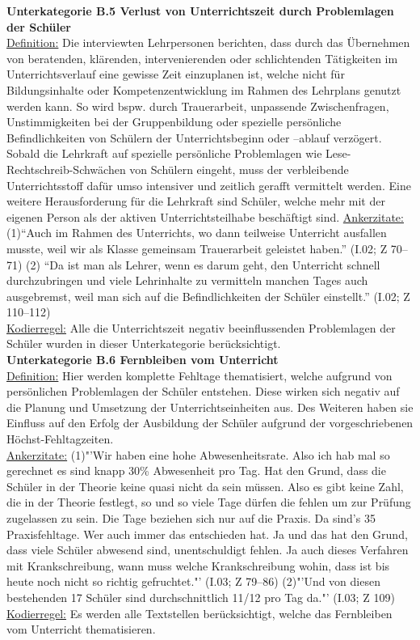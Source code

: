 \textbf{Unterkategorie B.5 Verlust von Unterrichtszeit durch Problemlagen der Schüler}\\
\underline{Definition:} Die interviewten Lehrpersonen berichten, dass durch das Übernehmen von beratenden, klärenden, intervenierenden oder schlichtenden Tätigkeiten im Unterrichtsverlauf eine gewisse Zeit einzuplanen ist, welche nicht für Bildungsinhalte oder Kompetenzentwicklung im Rahmen des Lehrplans genutzt werden kann. So wird bspw. durch Trauerarbeit, unpassende Zwischenfragen, Unstimmigkeiten bei der Gruppenbildung oder spezielle persönliche Befindlichkeiten von Schülern der Unterrichtsbeginn oder --ablauf verzögert. Sobald die Lehrkraft auf spezielle persönliche Problemlagen wie Lese-Rechtschreib-Schwächen von Schülern eingeht, muss der verbleibende Unterrichtsstoff dafür umso intensiver und zeitlich gerafft vermittelt werden. Eine weitere Herausforderung für die Lehrkraft sind Schüler, welche mehr mit der eigenen Person als der aktiven Unterrichtsteilhabe beschäftigt sind.
\underline{Ankerzitate:} (1)"`Auch im Rahmen des Unterrichts, wo dann teilweise Unterricht ausfallen musste, weil wir als Klasse gemeinsam Trauerarbeit geleistet haben."' (I.02; Z 70--71) (2) "`Da ist man als Lehrer, wenn es darum geht, den Unterricht schnell durchzubringen und viele Lehrinhalte zu vermitteln manchen Tages auch ausgebremst, weil man sich auf die Befindlichkeiten der Schüler einstellt."' (I.02; Z 110--112)\\
\underline{Kodierregel:} Alle die Unterrichtszeit negativ beeinflussenden Problemlagen der Schüler wurden in dieser Unterkategorie berücksichtigt.\\

\textbf{Unterkategorie B.6 Fernbleiben vom Unterricht}\\
\underline{Definition:} Hier werden komplette Fehltage thematisiert, welche aufgrund von persönlichen Problemlagen der Schüler entstehen. Diese wirken sich negativ auf die Planung und Umsetzung der Unterrichtseinheiten aus. Des Weiteren haben sie Einfluss auf den Erfolg der Ausbildung der Schüler aufgrund der vorgeschriebenen Höchst-Fehltagzeiten.\\
\underline{Ankerzitate:} (1)"'Wir haben eine hohe Abwesenheitsrate. Also ich hab mal so gerechnet es sind knapp 30\% Abwesenheit pro Tag. Hat den Grund, dass die Schüler in der Theorie keine quasi nicht da sein müssen. Also es gibt keine Zahl, die in der Theorie festlegt, so und so viele Tage dürfen die fehlen um zur Prüfung zugelassen zu sein. Die Tage beziehen sich nur auf die Praxis. Da sind's 35 Praxisfehltage. Wer auch immer das entschieden hat. Ja und das hat den Grund, dass viele Schüler abwesend sind, unentschuldigt fehlen. Ja auch dieses Verfahren mit Krankschreibung, wann muss welche Krankschreibung wohin, dass ist bis heute noch nicht so richtig gefruchtet."' (I.03; Z 79--86) (2)"'Und von diesen bestehenden 17 Schüler sind durchschnittlich 11/12 pro Tag da."' (I.03; Z 109)\\
\underline{Kodierregel:} Es werden alle Textstellen berücksichtigt, welche das Fernbleiben vom Unterricht thematisieren.\\

